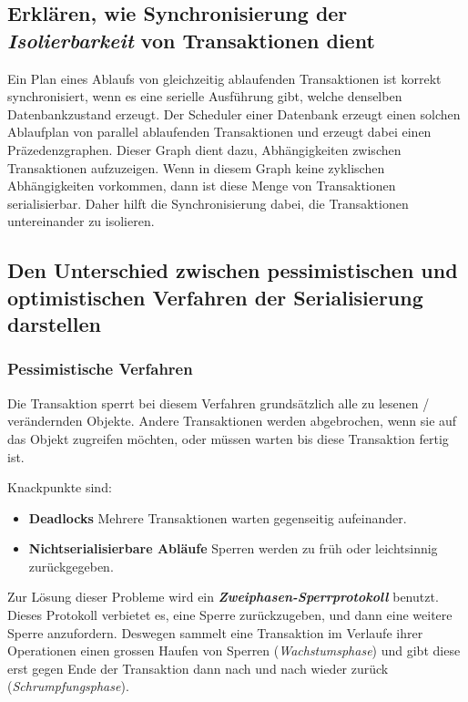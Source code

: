 \subsection{Erklären, wie Synchronisierung der \emph{Isolierbarkeit} von Transaktionen dient}
Ein Plan eines Ablaufs von gleichzeitig ablaufenden Transaktionen ist korrekt synchronisiert, wenn es eine serielle Ausführung gibt, welche denselben Datenbankzustand erzeugt. Der Scheduler einer Datenbank erzeugt einen solchen Ablaufplan von parallel ablaufenden Transaktionen und erzeugt dabei einen Präzedenzgraphen. Dieser Graph dient dazu, Abhängigkeiten zwischen Transaktionen aufzuzeigen. Wenn in diesem Graph keine zyklischen Abhängigkeiten vorkommen, dann ist diese Menge von Transaktionen serialisierbar. Daher hilft die Synchronisierung dabei, die Transaktionen untereinander zu isolieren.

\subsection{Den Unterschied zwischen pessimistischen und optimistischen Verfahren der Serialisierung darstellen}

\subsubsection{Pessimistische Verfahren}
Die Transaktion sperrt bei diesem Verfahren grundsätzlich alle zu lesenen / verändernden Objekte. Andere Transaktionen werden abgebrochen, wenn sie auf das Objekt zugreifen möchten, oder müssen warten bis diese Transaktion fertig ist.

Knackpunkte sind:
\begin{itemize}
  \item \textbf{Deadlocks} 
  Mehrere Transaktionen warten gegenseitig aufeinander.
  \item \textbf{Nichtserialisierbare Abläufe}
  Sperren werden zu früh oder leichtsinnig zurückgegeben.
\end{itemize}

Zur Lösung dieser Probleme wird ein \textbf{\emph{Zweiphasen-Sperrprotokoll}} benutzt. Dieses Protokoll verbietet es, eine Sperre zurückzugeben, und dann eine weitere Sperre anzufordern. Deswegen sammelt eine Transaktion im Verlaufe ihrer Operationen einen grossen Haufen von Sperren (\emph{Wachstumsphase}) und gibt diese erst gegen Ende der Transaktion dann nach und nach wieder zurück (\emph{Schrumpfungsphase}).


